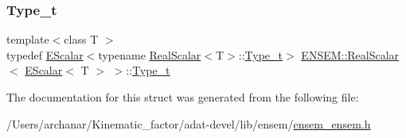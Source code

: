 \subsubsection{\texorpdfstring{Type\_t}{Type\_t}\hspace{0.1cm}{\footnotesize\ttfamily [3/3]}}
{\footnotesize\ttfamily template$<$class T $>$ \\
typedef \mbox{\hyperlink{classENSEM_1_1EScalar}{E\+Scalar}}$<$typename \mbox{\hyperlink{structENSEM_1_1RealScalar}{Real\+Scalar}}$<$T$>$\+::\mbox{\hyperlink{structENSEM_1_1RealScalar_3_01EScalar_3_01T_01_4_01_4_a5aaad1821350deadcff050085f21ff07}{Type\+\_\+t}}$>$ \mbox{\hyperlink{structENSEM_1_1RealScalar}{E\+N\+S\+E\+M\+::\+Real\+Scalar}}$<$ \mbox{\hyperlink{classENSEM_1_1EScalar}{E\+Scalar}}$<$ T $>$ $>$\+::\mbox{\hyperlink{structENSEM_1_1RealScalar_3_01EScalar_3_01T_01_4_01_4_a5aaad1821350deadcff050085f21ff07}{Type\+\_\+t}}}



The documentation for this struct was generated from the following file\+:\begin{DoxyCompactItemize}
\item 
/\+Users/archanar/\+Kinematic\+\_\+factor/adat-\/devel/lib/ensem/\mbox{\hyperlink{adat-devel_2lib_2ensem_2ensem__ensem_8h}{ensem\+\_\+ensem.\+h}}\end{DoxyCompactItemize}
